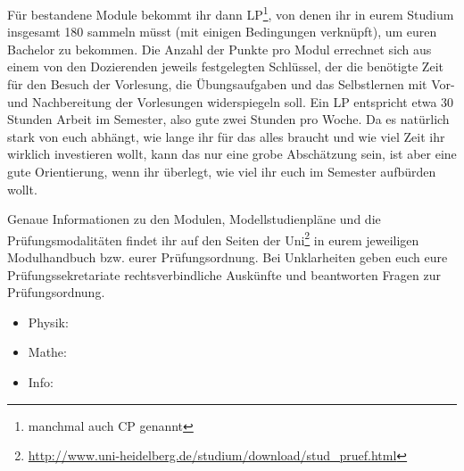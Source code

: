 Für bestandene Module bekommt ihr dann \gls{LP}\footnote{manchmal auch \gls{CP} genannt}, von denen ihr in eurem Studium insgesamt 180 sammeln müsst (mit einigen Bedingungen verknüpft), um euren Bachelor zu bekommen. Die Anzahl der Punkte pro Modul errechnet sich aus einem von den Dozierenden jeweils festgelegten Schlüssel, der die benötigte Zeit für den Besuch der Vorlesung, die Übungsaufgaben und das Selbstlernen mit Vor- und Nachbereitung der Vorlesungen widerspiegeln soll. Ein \gls{LP} entspricht etwa 30 Stunden Arbeit im Semester, also gute zwei Stunden pro Woche. Da es natürlich stark von euch abhängt, wie lange ihr für das alles braucht und wie viel Zeit ihr wirklich investieren wollt, kann das nur eine grobe Abschätzung sein, ist aber eine gute Orientierung, wenn ihr überlegt, wie viel ihr euch im Semester aufbürden wollt.

Genaue Informationen zu den Modulen, Modellstudienpläne und die Prüfungsmodalitäten findet ihr auf den Seiten der Uni\footnote{\url{http://www.uni-heidelberg.de/studium/download/stud_pruef.html}} in eurem jeweiligen Modulhandbuch bzw. eurer Prüfungsordnung. Bei Unklarheiten geben euch eure Prüfungssekretariate rechtsverbindliche Auskünfte und beantworten Fragen zur Prüfungsordnung. 
\begin{itemize}
	\item Physik: \pruefsekphysik
	\item Mathe: \pruefsekmathe
	\item Info: \pruefsekinfo
\end{itemize}



